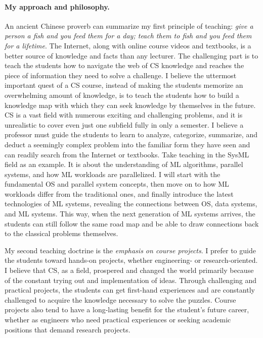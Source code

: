 \documentclass[letterpaper]{article}
\begin{document}
\paragraph{My approach and philosophy.} An ancient Chinese proverb can summarize my first principle of teaching: \textit{give a person a fish and you feed them for a day; teach them to fish and you feed them for a lifetime}. The Internet, along with online course videos and textbooks, is a better source of knowledge and facts than any lecturer. The challenging part is to teach the students how to navigate the web of CS knowledge and reaches the piece of information they need to solve a challenge. I believe the uttermost important quest of a CS course, instead of making the students memorize an overwhelming amount of knowledge, is to teach the students how to build a knowledge map with which they can seek knowledge by themselves in the future. CS is a vast field with numerous exciting and challenging problems, and it is unrealistic to cover even just one subfield fully in only a semester. I believe a professor must guide the students to learn to analyze, categorize, summarize, and deduct a seemingly complex problem into the familiar form they have seen and can readily search from the Internet or textbooks. Take teaching in the SysML field as an example. It is about the understanding of ML algorithms, parallel systems, and how ML workloads are parallelized. I will start with the fundamental OS and parallel system concepts, then move on to how ML workloads differ from the traditional ones, and finally introduce the latest technologies of ML systems, revealing the connections between OS, data systems, and ML systems. This way, when the next generation of ML systems arrives, the students can still follow the same road map and be able to draw connections back to the classical problems themselves. 

My second teaching doctrine is the \textit{emphasis on course projects}. I prefer to guide the students toward hands-on projects, whether engineering- or research-oriented. I believe that CS, as a field, prospered and changed the world primarily because of the constant trying out and implementation of ideas. Through challenging and practical projects, the students can get first-hand experiences and are constantly challenged to acquire the knowledge necessary to solve the puzzles. Course projects also tend to have a long-lasting benefit for the student's future career, whether as engineers who need practical experiences or seeking academic positions that demand research projects.
\end{document}
